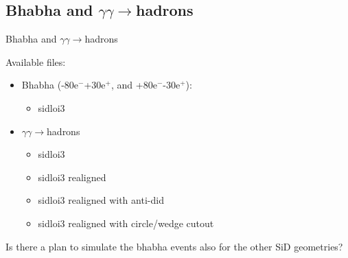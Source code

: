 \documentclass[xcolor={dvipsnames}]{beamer}
\newcommand{\eplus}{e$^+$\xspace}
\newcommand{\eminus}{e$^-$\xspace}
\begin{document}
\subsection{Bhabha and $\gamma\gamma\rightarrow$hadrons}
\begin{frame}
 \begin{center}
    \LARGE Bhabha and $\gamma\gamma\rightarrow$hadrons
 \end{center}
\end{frame}
\begin{frame}
Available files:
\begin{itemize}
 \item Bhabha (-80\eminus +30\eplus, and +80\eminus -30\eplus):
 \begin{itemize}
  \item sidloi3
 \end{itemize}
 \item $\gamma\gamma\rightarrow$hadrons
  \begin{itemize}
  \item sidloi3
  \item sidloi3 realigned
  \item sidloi3 realigned with anti-did
  \item sidloi3 realigned with circle/wedge cutout
 \end{itemize}
\end{itemize}
\vspace*{0.5cm}
Is there a plan to simulate the bhabha events also for the other SiD geometries?
\end{frame}
\end{document}
